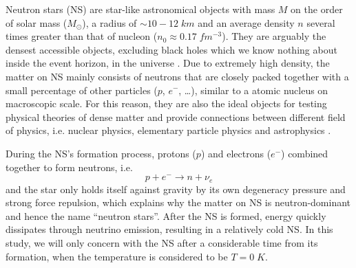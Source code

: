 
Neutron stars (\gls{NS}) are star-like astronomical objects with mass $M$ on the order of solar mass ($M_\odot$), a radius of $\sim 10-12\;km$ and an average density $n$ several times greater than that of nucleon ($n_0 \approx 0.17\;fm^{-3}$). They are arguably the densest accessible objects, excluding black holes which we know nothing about inside the event horizon, in the universe \citep{baym1975neutron}. Due to extremely high density, the matter on \gls{NS} mainly consists of neutrons that are closely packed together with a small percentage of other particles ($p$, $e^-$, \ldots), similar to a atomic nucleus on macroscopic scale. For this reason, they are also the ideal objects for testing physical theories of dense matter and provide connections between different field of physics, i.e. nuclear physics, elementary particle physics and astrophysics \citep{lattimer2004physics}.\par
During the \gls{NS}'s formation process, protons ($p$) and electrons ($e^-$) combined together to form neutrons, i.e.
\begin{equation}
        p + e^- \longrightarrow n + \nu_e
\end{equation}
and the star only holds itself against gravity by its own degeneracy pressure and strong force repulsion, which explains why the matter on \gls{NS} is neutron-dominant and hence the name ``neutron stars''. After the \gls{NS} is formed, energy quickly dissipates through neutrino emission, resulting in a relatively cold \gls{NS}. In this study, we will only concern with the \gls{NS} after a considerable time from its formation, when the temperature is considered to be $T=0\;K$.\par
